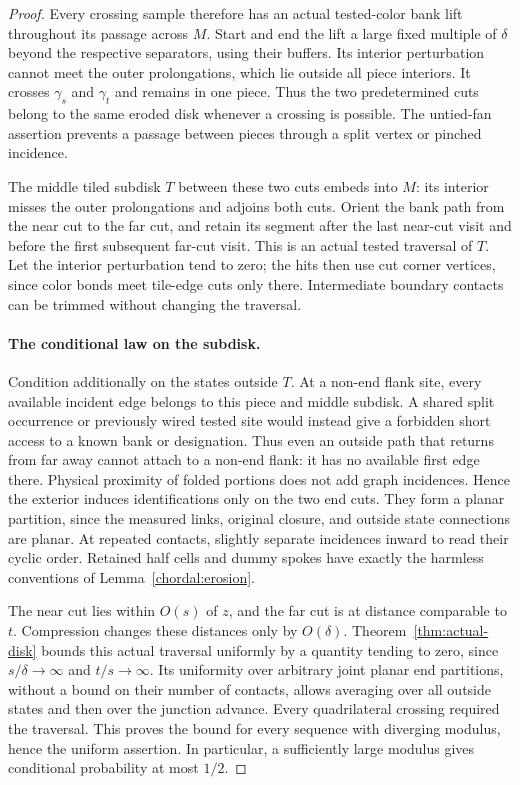 \begin{proof}
Every crossing sample therefore has an actual tested-color bank
lift throughout its passage across $M$.  Start and end the lift
a large fixed multiple of $\delta$ beyond the respective separators,
using their buffers.  Its interior perturbation cannot meet the
outer prolongations, which lie outside all piece interiors.
It crosses $\gamma_s$ and $\gamma_t$ and remains in one piece.
Thus the two predetermined cuts belong to the same eroded disk
whenever a crossing is possible.  The untied-fan assertion prevents
a passage between pieces through a split vertex or pinched incidence.

The middle tiled subdisk $T$ between these two cuts embeds into
$M$: its interior misses the outer prolongations and adjoins both
cuts.  Orient the bank path from the near cut to the far cut, and
retain its segment after the last near-cut visit and before the
first subsequent far-cut visit.  This is an actual tested traversal
of $T$.  Let the interior perturbation tend to zero;
the hits then use cut corner vertices, since color bonds meet
tile-edge cuts only there.  Intermediate boundary contacts can
be trimmed without changing the traversal.

\paragraph{The conditional law on the subdisk.}
Condition additionally on the states outside $T$.  At a non-end
flank site, every available incident edge belongs to this piece
and middle subdisk.  A shared split occurrence or previously
wired tested site would instead give a forbidden short access
to a known bank or designation.  Thus even an outside path that
returns from far away cannot attach to a non-end flank: it has no
available first edge there.  Physical proximity of folded portions
does not add graph incidences.  Hence the exterior induces
identifications only on the two end cuts.  They form a planar
partition, since the measured links, original closure, and outside
state connections are planar.  At repeated contacts, slightly
separate incidences inward to read their cyclic order.  Retained
half cells and dummy spokes have exactly the harmless conventions
of Lemma~\ref{chordal:erosion}.

The near cut lies within $O(s)$ of $z$, and the far cut is at
distance comparable to $t$.  Compression changes these distances
only by $O(\delta)$.  Theorem~\ref{thm:actual-disk} bounds this
actual traversal uniformly by a quantity tending to zero, since
$s/\delta\to\infty$ and $t/s\to\infty$.  Its uniformity over
arbitrary joint planar end partitions, without a bound on their
number of contacts, allows averaging over all outside
states and then over the junction advance.  Every quadrilateral
crossing required the traversal.  This proves the bound for every
sequence with diverging modulus, hence the uniform assertion.
In particular, a sufficiently large modulus gives conditional
probability at most $1/2$.


\end{proof}
